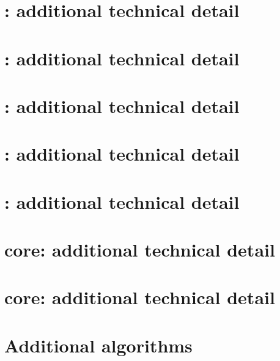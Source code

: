 \documentclass[preprint]{iacrtrans}
\begin{document}





\appendix

\clearpage
\section{:       additional technical detail}
\label{sec:pseudo:v1}

\clearpage
\section{:       additional technical detail}
\label{sec:pseudo:v2}

\clearpage
\section{:       additional technical detail}
\label{sec:pseudo:v3}

\clearpage
\section{:       additional technical detail}
\label{sec:pseudo:v4}

\clearpage
\section{:       additional technical detail}
\label{sec:pseudo:v5}


\clearpage
\section{\mbox{} core: additional technical detail}
\label{sec:core:2}

\clearpage
\section{\mbox{} core: additional technical detail}
\label{sec:core:1}


\clearpage
\section{Additional algorithms}
\label{sec:alg}


\end{document}
